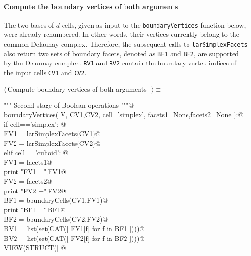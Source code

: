 \documentclass[11pt,oneside]{article}	%
\begin{document}
\paragraph{Compute the boundary vertices of both arguments}
The two bases of $d$-cells, given as input to the \texttt{boundaryVertices} function below, were already renumbered. In other words, their vertices currently belong to the common Delaunay complex. Therefore, the subsequent calls to \texttt{larSimplexFacets} also return two sets of boundary facets, denoted as \texttt{BF1} and \texttt{BF2}, are supported by the Delaunay complex. \texttt{BV1} and \texttt{BV2} contain the boundary vertex indices of the input cells \texttt{CV1} and \texttt{CV2}.

\begin{flushleft} \small \label{scrap12}
$\langle\,$Compute boundary vertices of both arguments\nobreak\ {\footnotesize {}}$\,\rangle\equiv$
\vspace{-1ex}
\begin{list}{}{} \item
\mbox{}\verb@""" Second stage of Boolean operations """@\\
\mbox{}\verb@def boundaryVertices( V, CV1,CV2, cell='simplex', facets1=None,facets2=None ):@\\
\mbox{}\verb@   if cell=='simplex': @\\
\mbox{}\verb@      FV1 = larSimplexFacets(CV1)@\\
\mbox{}\verb@      FV2 = larSimplexFacets(CV2)@\\
\mbox{}\verb@   elif cell=='cuboid': @\\
\mbox{}\verb@      FV1 = facets1@\\
\mbox{}\verb@      print "\n FV1 =",FV1@\\
\mbox{}\verb@      FV2 = facets2@\\
\mbox{}\verb@      print "\n FV2 =",FV2@\\
\mbox{}\verb@   BF1 = boundaryCells(CV1,FV1)@\\
\mbox{}\verb@   print "\n BF1 =",BF1@\\
\mbox{}\verb@   BF2 = boundaryCells(CV2,FV2)@\\
\mbox{}\verb@   BV1 = list(set(CAT([ FV1[f] for f in BF1 ])))@\\
\mbox{}\verb@   BV2 = list(set(CAT([ FV2[f] for f in BF2 ])))@\\
\mbox{}\verb@   VIEW(STRUCT([ @\\

\end{list}
\end{flushleft}
\end{document}
